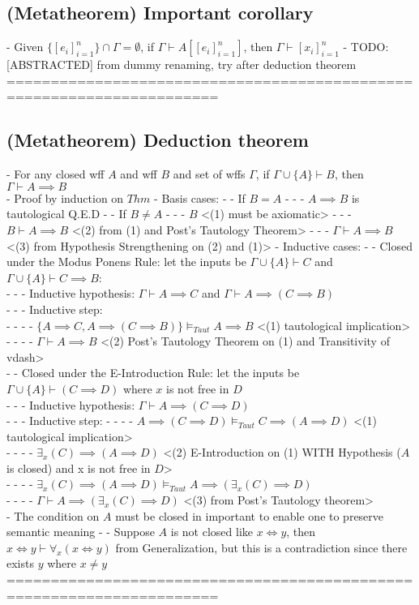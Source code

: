 \documentclass{article}
\begin{document}
\subsection{(Metatheorem) Important corollary}
	- Given $\{[e_i]_{i=1}^n\} \cap \Gamma = \emptyset$, if $\Gamma \vdash A[[e_i]_{i=1}^n]$, then $\Gamma \vdash [x_i]_{i=1}^n$
	- TODO: [ABSTRACTED] from dummy renaming, try after deduction theorem
	======================================================================
\subsection{(Metatheorem) Deduction theorem}
	- For any closed wff $A$ and wff $B$ and set of wffs $\Gamma$, if $\Gamma \cup \{A\} \vdash B$, then $\Gamma \vdash A \implies B$ \\
	- Proof by induction on $Thm$
	- Basis cases:
		- - If $B = A$
			- - - $A \implies B$ is tautological Q.E.D
		- - If $B \neq A$
			- - - $B$ <(1) must be \Gamma axiomatic>
			- - - $B \vdash A \implies B$ <(2) from (1) and Post's Tautology Theorem>
			- - - $\Gamma \vdash A \implies B$ <(3) from Hypothesis Strengthening on (2) and (1)>
	- Inductive cases:
		- - Closed under the Modus Ponens Rule: let the inputs be $\Gamma \cup \{A\} \vdash C$ and $\Gamma \cup \{A\} \vdash C \implies B$: \\
			- - - Inductive hypothesis: $\Gamma \vdash A \implies C$ and $\Gamma \vdash A \implies (C \implies B)$ \\
			- - - Inductive step: \\
				- - - - $\{A \implies C, A \implies (C \implies B)\} \vDash_{Taut} A \implies B$ <(1) tautological implication> \\
				- - - - $\Gamma \vdash A \implies B$ <(2) Post's Tautology Theorem on (1) and Transitivity of vdash> \\
		- - Closed under the E-Introduction Rule: let the inputs be $\Gamma \cup \{A\} \vdash (C \implies D)$ where $x$ is not free in $D$ \\
			- - - Inductive hypothesis: $\Gamma \vdash A \implies (C \implies D)$ \\
			- - - Inductive step:
				- - - - $A \implies (C \implies D) \vDash_{Taut} C \implies (A \implies D)$ <(1) tautological implication> \\
				- - - - $\exists_x(C) \implies (A \implies D)$ <(2) E-Introduction on (1) WITH Hypothesis ($A$ is closed) and x is not free in $D$> \\
				- - - - $\exists_x(C) \implies (A \implies D) \vDash_{Taut} A \implies (\exists_x(C) \implies D)$ \\
				- - - - $\Gamma \vdash A \implies (\exists_x(C) \implies D)$ <(3) from Post's Tautology theorem> \\
	- The condition on $A$ must be closed in important to enable one to preserve semantic meaning
	- - Suppose $A$ is not closed like $x \iff y$, then $x \iff y \vdash \forall_x(x \iff y)$ from Generalization, but this is a contradiction since there exists $y$ where $x \neq y$
	======================================================================
\end{document}
